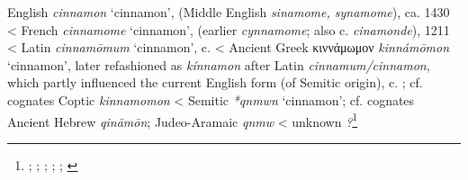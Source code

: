 \begin{etymology}\label{ety:cinnamon}
English \textit{cinnamon} `cinnamon', (Middle English \textit{sinamome, synamome}), ca. 1430
< French \textit{cinnamome} `cinnamon', (earlier \textit{cynnamome}; also  c. \textit{cinamonde}), 1211
< Latin \textit{cinnamōmum} `cinnamon',  c. \AD{}
< Ancient Greek {κιννάμωμον} \textit{kinnámōmon} `cinnamon', later refashioned as \textit{kínnamon} after Latin \textit{cinnamum/cinnamon}, which partly influenced the current English form (of Semitic origin),  c. \BC{}; cf. cognates Coptic  \textit{kinnamomon}
< Semitic \textit{*qnmwn} `cinnamon'; cf. cognates Ancient Hebrew  \textit{qināmōn}; Judeo-Aramaic  \textit{qnmw}
< unknown \textit{?}\footnote{\textcite[s.v. cinnamon]{oed}; \textcite{tlfi}; \textcite{lewis_latin_1879}; \textcite[701]{beekes_etymological_2010}; \textcite[585]{klein_comprehensive_1987}; \textcite{rosol_early_2018}}
\end{etymology}